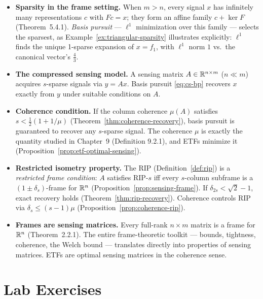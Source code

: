 \begin{itemize}
  \item \textbf{Sparsity in the frame setting.} When $m>n$, every
        signal $x$ has infinitely many representations $c$ with $Fc=x$;
        they form an affine family $c+\ker F$
        (Theorem~5.4.1). \emph{Basis pursuit} --- $\ell^1$ minimization
        over this family --- selects the sparsest, as
        Example~\ref{ex:triangular-sparsity} illustrates explicitly:
        $\ell^1$ finds the unique 1-sparse expansion of $x=f_1$, with
        $\ell^1$ norm $1$ vs.\ the canonical vector's $\tfrac43$.

  \item \textbf{The compressed sensing model.} A sensing matrix
        $A\in\mathbb{R}^{n\times m}$ ($n\ll m$) acquires $s$-sparse signals
        via $y=Ax$. Basis pursuit \eqref{eq:cs-bp} recovers $x$ exactly
        from $y$ under suitable conditions on $A$.

  \item \textbf{Coherence condition.} If the column coherence
        $\mu(A)$ satisfies $s<\tfrac12(1+1/\mu)$
        (Theorem~\ref{thm:coherence-recovery}), basis pursuit is
        guaranteed to recover any $s$-sparse signal. The coherence
        $\mu$ is exactly the quantity studied in Chapter~9 (Definition
        9.2.1), and ETFs minimize it (Proposition~\ref{prop:etf-optimal-sensing}).

  \item \textbf{Restricted isometry property.} The RIP
        (Definition~\ref{def:rip}) is a \emph{restricted frame
        condition}: $A$ satisfies RIP-$s$ iff every $s$-column
        subframe is a $(1\pm\delta_s)$-frame for $\mathbb{R}^n$
        (Proposition~\ref{prop:sensing-frame}). If $\delta_{2s}
        <\sqrt{2}-1$, exact recovery holds (Theorem~\ref{thm:rip-recovery}).
        Coherence controls RIP via $\delta_s\le(s-1)\mu$
        (Proposition~\ref{prop:coherence-rip}).

  \item \textbf{Frames are sensing matrices.} Every full-rank
        $n\times m$ matrix is a frame for $\mathbb{R}^n$ (Theorem~2.2.1).
        The entire frame-theoretic toolkit --- bounds, tightness,
        coherence, the Welch bound --- translates directly into
        properties of sensing matrices. ETFs are optimal sensing
        matrices in the coherence sense.
\end{itemize}

\section{Lab Exercises}
\label{sec:lab-ch12}

